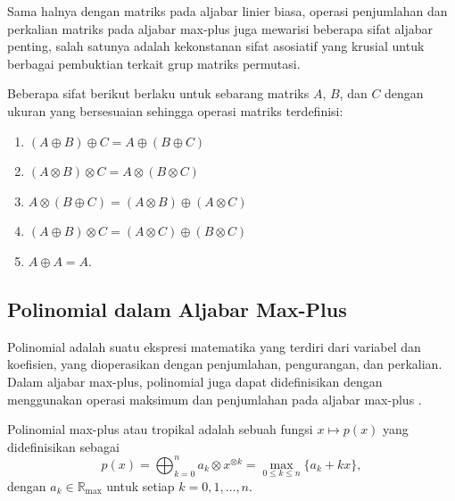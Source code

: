 Sama halnya dengan matriks pada aljabar linier biasa, operasi penjumlahan dan perkalian matriks pada aljabar max-plus juga mewarisi beberapa sifat aljabar penting, salah satunya adalah kekonstanan sifat asosiatif yang krusial untuk berbagai pembuktian terkait grup matriks permutasi.

\begin{teorema}\label{thm:sifat_matriks_maxplus}
  Beberapa sifat berikut berlaku untuk sebarang matriks $A$, $B$, dan $C$ dengan ukuran yang bersesuaian sehingga operasi matriks terdefinisi:
  \begin{enumerate}[label=(\roman*.)]
    \item $(A \oplus B) \oplus C = A \oplus (B \oplus C)$
    \item $(A \otimes B) \otimes C = A \otimes (B \otimes C)$
    \item $A \otimes (B \oplus C) = (A \otimes B) \oplus (A \otimes C)$
    \item $(A \oplus B) \otimes C = (A \otimes C) \oplus (B \otimes C)$
    \item $A \oplus A = A$.
  \end{enumerate}
\end{teorema}

\subsection{Polinomial dalam Aljabar Max-Plus}
Polinomial adalah suatu ekspresi matematika yang terdiri dari variabel dan koefisien, yang dioperasikan dengan penjumlahan, pengurangan, dan perkalian. Dalam aljabar max-plus, polinomial juga dapat didefinisikan dengan menggunakan operasi maksimum dan penjumlahan pada aljabar max-plus \parencite{burden2010numerical}.
\begin{definisi}
  Polinomial max-plus atau tropikal adalah sebuah fungsi $x\mapsto p(x)$ yang didefinisikan sebagai
  \[
    p(x) = \bigoplus_{k=0}^{n} a_{k} \otimes x^{\otimes k} = \max_{0 \leq k \leq n} \{a_{k} + kx\},
  \]
  dengan $a_k \in \mathbb{R}_{\max}$ untuk setiap $k = 0, 1, \ldots, n$.
\end{definisi}
